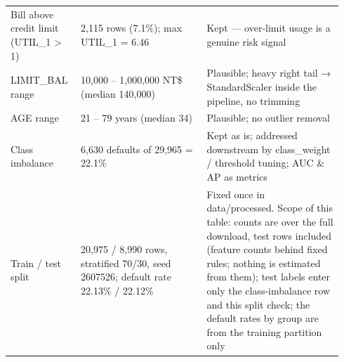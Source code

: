 \begin{table}[!htbp]
\begin{tabular}{@{}L{0.19\linewidth}L{0.36\linewidth}L{0.39\linewidth}@{}}
    Bill above credit limit (UTIL\_1 > 1) & 2,115 rows (7.1\%); max UTIL\_1 = 6.46 & Kept — over-limit usage is a genuine risk signal \\
    LIMIT\_BAL range & 10,000 – 1,000,000 NT\$ (median 140,000) & Plausible; heavy right tail → StandardScaler inside the pipeline, no trimming \\
    AGE range & 21 – 79 years (median 34) & Plausible; no outlier removal \\
    Class imbalance & 6,630 defaults of 29,965 = 22.1\% & Kept as is; addressed downstream by class\_weight / threshold tuning; AUC \& AP as metrics \\
    Train / test split & 20,975 / 8,990 rows, stratified 70/30, seed 2607526; default rate 22.13\% / 22.12\% & Fixed once in data/processed. Scope of this table: counts are over the full download, test rows included (feature counts behind fixed rules; nothing is estimated from them); test labels enter only the class-imbalance row and this split check; the default rates by group are from the training partition only \\
    \bottomrule
  \end{tabular}
\end{table}

